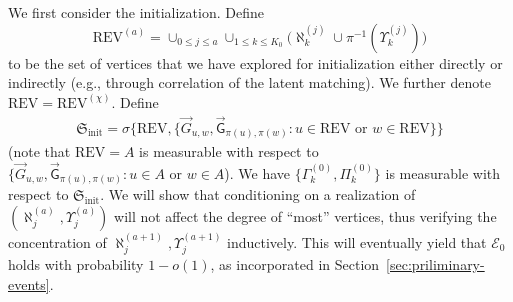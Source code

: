\documentclass[11pt]{article}
\numberwithin{equation}{section}
\begin{document}
We first consider the initialization. Define 
\begin{equation}\label{eq-def-REV}
    \mathrm{REV}^{(a)} = \cup_{0 \leq j \leq a} \cup_{1 \leq k \leq K_0} \big( \aleph^{(j)}_k \cup \pi^{-1}( \Upsilon^{(j)}_k ) \big)
\end{equation}
to be the set of vertices that we have explored for initialization either directly or indirectly (e.g., through correlation of the latent matching). We further denote $\mathrm{REV}=\mathrm{REV}^{(\chi)}$. Define
\begin{align*}
    \mathfrak{S}_{\mathrm{init}} = \sigma \big\{ \mathrm{REV}, \{ \overrightarrow{G}_{u,w}, \overrightarrow{\mathsf{G}}_{\pi(u), \pi(w)}: u \in \mathrm{REV} \mbox{ or } w \in \mathrm{REV} \} \big\}
\end{align*}
(note that $\mathrm{REV} = A$ is measurable with respect to $ \{ \overrightarrow{G}_{u,w}, \overrightarrow{\mathsf{G}}_{\pi(u), \pi(w)}: u \in A \mbox{ or } w \in A $).
We have $\{ \Gamma^{(0)}_k, \Pi^{(0)}_k \}$ is measurable with respect to $\mathfrak{S}_{\mathrm{init}}$. We will show that conditioning on a realization of $(\aleph^{(a)}_j,\Upsilon^{(a)}_j)$ will not affect the degree of ``most'' vertices, thus verifying the concentration of $\aleph^{(a+1)}_j, \Upsilon^{(a+1)}_j$ inductively. This will eventually yield that $\mathcal{E}_0$ holds with probability $1-o(1)$, as incorporated in Section~\ref{sec:priliminary-events}.
\end{document}
